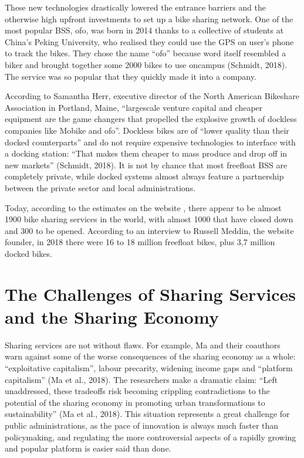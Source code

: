 \documentclass[letterpaper,10pt,english]{jupyterBook}
\begin{document}
\sphinxAtStartPar
These new technologies drastically lowered the entrance barriers and the otherwise high upfront investments to set up a bike sharing network. One of the most popular BSS, ofo, was born in 2014 thanks to a collective of students at China’s Peking University, who realised they could use the GPS on user’s phone to track the bikes. They chose the name “ofo” because word itself resembled a biker and brought together some 2000 bikes to use on\sphinxhyphen{}campus (Schmidt, 2018). The service was so popular that they quickly made it into a company.

\sphinxAtStartPar
According to Samantha Herr, executive director of the North American Bikeshare Association in Portland, Maine, “large\sphinxhyphen{}scale venture capital and cheaper equipment are the game changers that propelled the explosive growth of dockless companies like Mobike and ofo”. Dockless bikes are of “lower quality than their docked counterparts” and do not require expensive technologies to interface with a docking station: “That makes them cheaper to mass produce and drop off in new markets” (Schmidt, 2018). It is not by chance that most free\sphinxhyphen{}float BSS are completely private, while docked systems almost always feature a partnership between the private sector and local administrations.

\sphinxAtStartPar
Today, according to the estimates on the website , there appear to be almost 1900 bike sharing services in the world, with almost 1000 that have closed down and 300 to be opened. According to an interview to Russell Meddin, the website founder, in 2018 there were 16 to 18 million free\sphinxhyphen{}float bikes, plus 3,7 million docked bikes.


\section{The Challenges of Sharing Services and the Sharing Economy}
\label{\detokenize{02-bikesharing_and_bikemi:the-challenges-of-sharing-services-and-the-sharing-economy}}
\sphinxAtStartPar
Sharing services are not without flaws. For example, Ma and their coauthors warn against some of the worse consequences of the sharing economy as a whole: “exploitative capitalism”, labour precarity, widening income gaps and “platform capitalism” (Ma et al., 2018). The researchers make a dramatic claim: “Left unaddressed, these trade\sphinxhyphen{}offs risk becoming crippling contradictions to the potential of the sharing economy in promoting urban transformations to sustainability” (Ma et al., 2018). This situation represents a great challenge for public administrations, as the pace of innovation is always much faster than policy\sphinxhyphen{}making, and regulating the more controversial aspects of a rapidly growing and popular platform is easier said than done.
\end{document}
